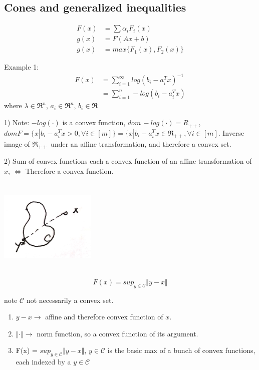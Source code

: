 \subsection{Cones and generalized inequalities}

\begin{align*}
F(x) &=\sum\alpha_iF_i(x)\\
g(x) &= F(Ax + b)\\
g(x) &= max\{F_1(x), F_2(x) \}
\end{align*}

Example 1:
\begin{align*}
F(x) &= \sum^{\infty}_{i=1}log(b_i - a_i^Tx)^{-1}\\
&=\sum^n_{i=1}-log(b_i - a_i^Tx)
\end{align*}
where $\lambda \in \Re^n$, $a_i\in \Re^n$, $b_i\in \Re$

1) Note: $-log(\cdot)$ is a convex function, $dom\, -log(\cdot) = R_{++}$, $domF = \{x|b_i - a_i^Tx >0, \forall i\in [m] \} =\{x|b_i - a_i^Tx \in \Re_{++}, \forall i\in [m]$. Inverse image of $\Re_{++}$ under an affine transformation, and therefore a convex set. 

2) Sum of convex functions each a convex function of an affine transformation of $x$, $\Leftrightarrow$ Therefore a convex function.\\

\begin{example}
	
\begin{marginfigure}
	\centering
	\includegraphics[width=1.8in,height=1.8in]{figures/ch08/figure1104_1.png}
\end{marginfigure}

\begin{equation*}
F(x) = sup_{y\in \mathcal{C}}\Vert y-x\Vert
\end{equation*}

note $\mathcal{C}$ not necessarily a convex set. 

\begin{enumerate}
	\item $y-x\rightarrow$ affine and therefore convex function of $x$.
	
	\item $\Vert\cdot\Vert\rightarrow$ norm function, so a convex function of its argument. 
	
	\item F(x) = $sup_{y\in \mathcal{C}}\Vert y-x\Vert$, $y\in \mathcal{C}$ is the basic max of a bunch of convex functions, each indexed by a $y\in \mathcal{C}$
\end{enumerate}
\end{example}

